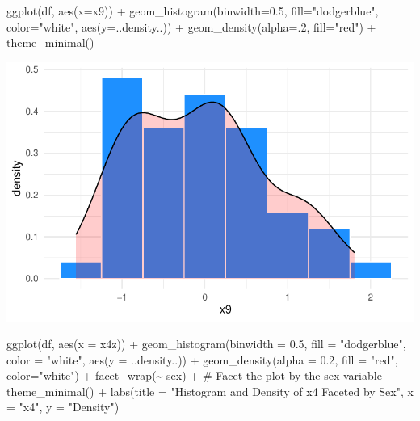 \documentclass[
  letterpaper,
  DIV=11,
  numbers=noendperiod]{scrartcl}
\newenvironment{Shaded}{\begin{snugshade}}{\end{snugshade}}
\newcommand{\AttributeTok}[1]{\textcolor[rgb]{0.40,0.45,0.13}{#1}}
\newcommand{\CommentTok}[1]{\textcolor[rgb]{0.37,0.37,0.37}{#1}}
\newcommand{\DecValTok}[1]{\textcolor[rgb]{0.68,0.00,0.00}{#1}}
\newcommand{\FloatTok}[1]{\textcolor[rgb]{0.68,0.00,0.00}{#1}}
\newcommand{\FunctionTok}[1]{\textcolor[rgb]{0.28,0.35,0.67}{#1}}
\newcommand{\NormalTok}[1]{\textcolor[rgb]{0.00,0.23,0.31}{#1}}
\newcommand{\SpecialCharTok}[1]{\textcolor[rgb]{0.37,0.37,0.37}{#1}}
\newcommand{\StringTok}[1]{\textcolor[rgb]{0.13,0.47,0.30}{#1}}
\begin{document}
\begin{Shaded}
\begin{Highlighting}[]
\FunctionTok{ggplot}\NormalTok{(df, }\FunctionTok{aes}\NormalTok{(}\AttributeTok{x=}\NormalTok{x9)) }\SpecialCharTok{+} 
  \FunctionTok{geom\_histogram}\NormalTok{(}\AttributeTok{binwidth=}\FloatTok{0.5}\NormalTok{, }\AttributeTok{fill=}\StringTok{"dodgerblue"}\NormalTok{, }\AttributeTok{color=}\StringTok{"white"}\NormalTok{, }\FunctionTok{aes}\NormalTok{(}\AttributeTok{y=}\NormalTok{..density..)) }\SpecialCharTok{+} 
  \FunctionTok{geom\_density}\NormalTok{(}\AttributeTok{alpha=}\NormalTok{.}\DecValTok{2}\NormalTok{, }\AttributeTok{fill=}\StringTok{"red"}\NormalTok{) }\SpecialCharTok{+}
  \FunctionTok{theme\_minimal}\NormalTok{()}
\end{Highlighting}
\end{Shaded}

\includegraphics{Module-1-Script-v2_files/figure-pdf/unnamed-chunk-7-1.pdf}

\begin{Shaded}
\begin{Highlighting}[]
\FunctionTok{ggplot}\NormalTok{(df, }\FunctionTok{aes}\NormalTok{(}\AttributeTok{x =}\NormalTok{ x4z)) }\SpecialCharTok{+} 
  \FunctionTok{geom\_histogram}\NormalTok{(}\AttributeTok{binwidth =} \FloatTok{0.5}\NormalTok{, }\AttributeTok{fill =} \StringTok{"dodgerblue"}\NormalTok{, }\AttributeTok{color =} \StringTok{"white"}\NormalTok{, }\FunctionTok{aes}\NormalTok{(}\AttributeTok{y =}\NormalTok{ ..density..)) }\SpecialCharTok{+} 
  \FunctionTok{geom\_density}\NormalTok{(}\AttributeTok{alpha =} \FloatTok{0.2}\NormalTok{, }\AttributeTok{fill =} \StringTok{"red"}\NormalTok{, }\AttributeTok{color=}\StringTok{"white"}\NormalTok{) }\SpecialCharTok{+}
  \FunctionTok{facet\_wrap}\NormalTok{(}\SpecialCharTok{\textasciitilde{}}\NormalTok{ sex) }\SpecialCharTok{+}  \CommentTok{\# Facet the plot by the sex variable}
  \FunctionTok{theme\_minimal}\NormalTok{() }\SpecialCharTok{+}
  \FunctionTok{labs}\NormalTok{(}\AttributeTok{title =} \StringTok{"Histogram and Density of x4 Faceted by Sex"}\NormalTok{, }\AttributeTok{x =} \StringTok{"x4"}\NormalTok{, }\AttributeTok{y =} \StringTok{"Density"}\NormalTok{)}
\end{Highlighting}
\end{Shaded}
\end{document}
